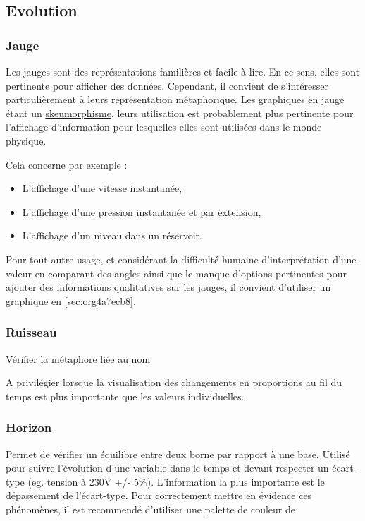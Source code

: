 \documentclass[a4paper,12pt]{article}
\begin{document}
\begin{multicols}{2}
\subsection{Evolution}
\label{sec:org5cc5f5b}
\subsubsection{Jauge}
\label{sec:orgf2b16ac}
Les jauges sont des représentations familières et facile à lire. \autocite{jonathanschwabishComparingCategories2021} En ce sens, elles sont pertinente pour afficher des données. Cependant, il convient de s'intéresser particulièrement à leurs représentation métaphorique. Les graphiques en jauge étant un \protect\hyperlink{gls-21}{\label{gls-21-use-1}skeumorphisme}, leurs utilisation est probablement plus pertinente pour l'affichage d'information pour lesquelles elles sont utilisées dans le monde physique.

Cela concerne par exemple :
\begin{itemize}
\item L'affichage d'une vitesse instantanée,
\item L'affichage d'une pression instantanée et par extension,
\item L'affichage d'un niveau dans un réservoir.
\end{itemize}

Pour tout autre usage, et considérant la difficulté humaine d'interprétation d'une valeur en comparant des angles ainsi que le manque d'options pertinentes pour ajouter des informations qualitatives sur les jauges, il convient d'utiliser un graphique en \ref{sec:org4a7ecb8}.
\subsubsection{Ruisseau}
\label{sec:orga40d2dc}
Vérifier la métaphore liée au nom

A privilégier lorsque la visualisation des changements en proportions au fil du temps est plus importante que les valeurs individuelles. \autocite{alansmithLexiqueVisuel}
\subsubsection{Horizon}
\label{sec:orga541f1d}
Permet de vérifier un équilibre entre deux borne par rapport à une base. \autocite{alansmithLexiqueVisuel}  Utilisé pour suivre l'évolution d'une variable dans le temps et devant respecter un écart-type (eg. tension à 230V +/- 5\%). L'information la plus importante est le dépassement de l'écart-type. Pour correctement mettre en évidence ces phénomènes, il est recommendé d'utiliser une palette de couleur de

\end{multicols}
\end{document}
